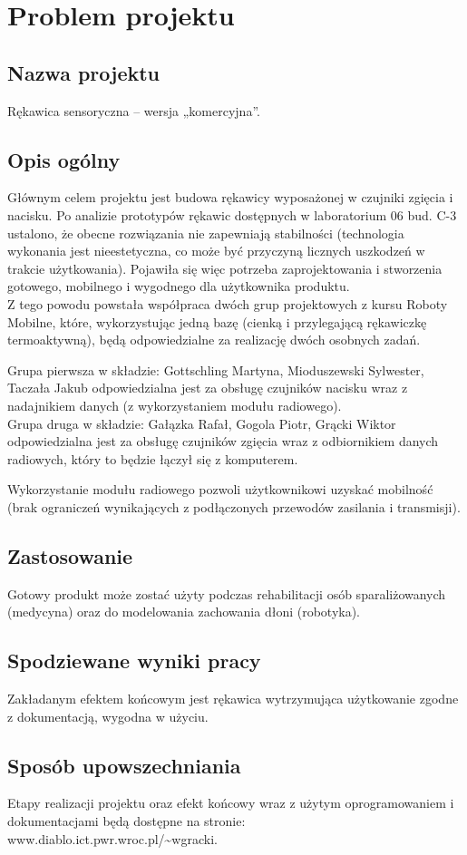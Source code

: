 \section{Problem projektu}
\label{sec:problem_projektu} %

\subsection{Nazwa projektu} %
\label{subsec:nazwa_projektu}         %
Rękawica sensoryczna – wersja „komercyjna”.
\subsection{Opis ogólny} 
\label{subsec:opis_ogolny} 
 
 
Głównym celem projektu jest budowa rękawicy wyposażonej w czujniki zgięcia i nacisku. Po analizie prototypów rękawic dostępnych w laboratorium 06 bud. C-3 ustalono, że obecne rozwiązania nie zapewniają stabilności (technologia wykonania jest nieestetyczna, co może być przyczyną licznych uszkodzeń w trakcie użytkowania). Pojawiła się więc potrzeba zaprojektowania i stworzenia gotowego, mobilnego i wygodnego dla użytkownika produktu.\\ Z tego powodu powstała współpraca dwóch grup projektowych z kursu Roboty Mobilne, które, wykorzystując jedną bazę (cienką i przylegającą rękawiczkę termoaktywną), będą odpowiedzialne za realizację dwóch osobnych zadań.

Grupa pierwsza w składzie: Gottschling Martyna, Mioduszewski Sylwester, Taczała Jakub odpowiedzialna jest za obsługę czujników nacisku wraz z nadajnikiem danych (z wykorzystaniem modułu radiowego).\\
Grupa druga w składzie: Gałązka Rafał, Gogola Piotr, Grącki Wiktor odpowiedzialna jest za obsługę czujników zgięcia wraz z odbiornikiem danych radiowych, który to będzie łączył się z komputerem.

Wykorzystanie modułu radiowego pozwoli użytkownikowi uzyskać mobilność (brak ograniczeń wynikających z podłączonych przewodów zasilania i transmisji).
\subsection{Zastosowanie} 
\label{subsec:zastosowanie}        
Gotowy produkt może zostać użyty podczas rehabilitacji osób sparaliżowanych (medycyna) oraz do modelowania zachowania dłoni (robotyka).
\subsection{Spodziewane wyniki pracy} 
\label{subsec:spodziewane_wyniki_pracy}         
Zakładanym efektem końcowym jest rękawica wytrzymująca użytkowanie zgodne z dokumentacją, wygodna w użyciu.
\subsection{Sposób upowszechniania} 
\label{subsec:sposob_upowszechniania}        
Etapy realizacji projektu oraz efekt końcowy wraz z użytym oprogramowaniem 
i dokumentacjami będą dostępne na stronie:\\ www.diablo.ict.pwr.wroc.pl/\~{}wgracki.
